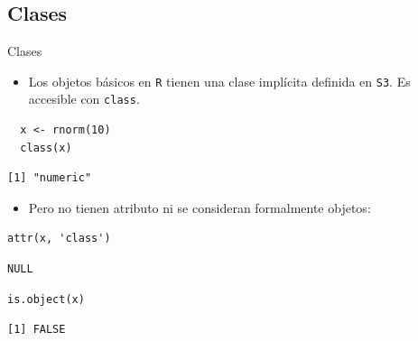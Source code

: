 \documentclass[xcolor={usenames,svgnames,dvipsnames}]{beamer}
\begin{document}
\subsection{Clases}
\label{sec:orgheadline9}
\begin{frame}[fragile,label={sec:orgheadline5}]{Clases}
 \begin{itemize}
\item Los objetos básicos en \texttt{R} tienen una clase implícita definida en \texttt{S3}. Es accesible con \texttt{class}.
\end{itemize}
\lstset{language=R,label= ,caption= ,captionpos=b,numbers=none}
\begin{lstlisting}
  x <- rnorm(10)
  class(x)
\end{lstlisting}

\begin{verbatim}
[1] "numeric"
\end{verbatim}

\begin{itemize}
\item Pero no tienen atributo ni se consideran formalmente objetos:
\end{itemize}
\lstset{language=R,label= ,caption= ,captionpos=b,numbers=none}
\begin{lstlisting}
attr(x, 'class')
\end{lstlisting}

\begin{verbatim}
NULL
\end{verbatim}

\lstset{language=R,label= ,caption= ,captionpos=b,numbers=none}
\begin{lstlisting}
is.object(x)
\end{lstlisting}

\begin{verbatim}
[1] FALSE
\end{verbatim}
\end{frame}
\end{document}

